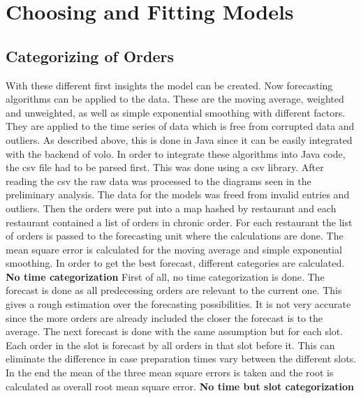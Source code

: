 \section{Choosing and Fitting Models}\label{section:Preliminary Analysis}
\subsection{Categorizing of Orders}\label{subsection:Categorizing by Order}
With these different first insights the model can be created. Now forecasting algorithms can be applied to the data. These are the moving average, weighted and unweighted, as well as simple exponential smoothing with different factors. They are applied to the time series of data which is free from corrupted data and outliers. As described above, this is done in Java since it can be easily integrated with the backend of volo.
In order to integrate these algorithms into Java code, the csv file had to be parsed first. This was done using a csv library. After reading the csv the raw data was processed to the diagrams seen in the preliminary analysis. The data for the models was freed from invalid entries and outliers. Then the orders were put into a map hashed by restaurant and each restaurant contained a list of orders in chronic order. For each restaurant the list of orders is passed to the forecasting unit where the calculations are done. The mean square error is calculated for the moving average and simple exponential smoothing. In order to get the best forecast, different categories are calculated.
\newline\newline\textbf{No time categorization}\newline
First of all, no time categorization is done. The forecast is done as all predecessing orders are relevant to the current one. This gives a rough estimation over the forecasting possibilities. It is not very accurate since the more orders are already included the closer the forecast is to the average. The next forecast is done with the same assumption but for each slot. Each order in the slot is forecast by all orders in that slot before it. This can eliminate the difference in case preparation times vary between the different slots. In the end the mean of the three mean square errors is taken and the root is calculated as overall root mean square error.
\newline\newline\textbf{No time but slot categorization}\newline
